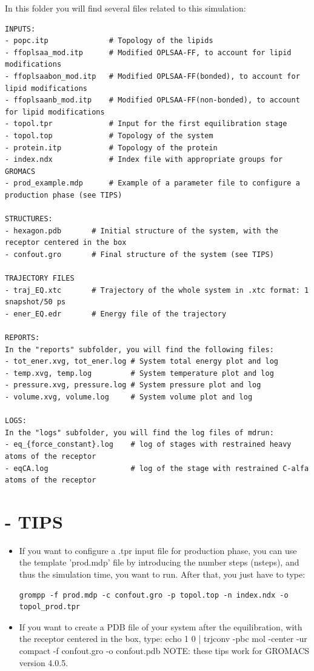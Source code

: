 \documentclass[10pt, oneside, pdftex]{article}
\begin{document}
In this folder you will find several files related to this simulation:

\begin{Verbatim}
INPUTS:
- popc.itp              # Topology of the lipids
- ffoplsaa_mod.itp      # Modified OPLSAA-FF, to account for lipid modifications
- ffoplsaabon_mod.itp   # Modified OPLSAA-FF(bonded), to account for lipid modifications
- ffoplsaanb_mod.itp    # Modified OPLSAA-FF(non-bonded), to account for lipid modifications
- topol.tpr             # Input for the first equilibration stage
- topol.top             # Topology of the system
- protein.itp           # Topology of the protein
- index.ndx             # Index file with appropriate groups for GROMACS
- prod_example.mdp      # Example of a parameter file to configure a production phase (see TIPS)

STRUCTURES:
- hexagon.pdb   	# Initial structure of the system, with the receptor centered in the box
- confout.gro   	# Final structure of the system (see TIPS)

TRAJECTORY FILES
- traj_EQ.xtc   	# Trajectory of the whole system in .xtc format: 1 snapshot/50 ps	 
- ener_EQ.edr   	# Energy file of the trajectory

REPORTS:
In the "reports" subfolder, you will find the following files:
- tot_ener.xvg, tot_ener.log # System total energy plot and log
- temp.xvg, temp.log         # System temperature plot and log
- pressure.xvg, pressure.log # System pressure plot and log
- volume.xvg, volume.log     # System volume plot and log

LOGS:
In the "logs" subfolder, you will find the log files of mdrun:
- eq_{force_constant}.log    # log of stages with restrained heavy atoms of the receptor
- eqCA.log                   # log of the stage with restrained C-alfa atoms of the receptor
\end{Verbatim}

\section*{ - TIPS}
\begin{itemize}
\item{If you want to configure a .tpr input file for production phase, you
can use the  template 'prod.mdp' file by introducing  the number steps
(nsteps), and thus  the simulation time, you want  to run. After that,
you just have to type:
\begin{Verbatim}
grompp -f prod.mdp -c confout.gro -p topol.top -n index.ndx -o topol_prod.tpr
\end{Verbatim}
}

\item{If  you  want  to  create  a  PDB file  of  your  system  after  the
equilibration, with the receptor centered in the box, type: echo 1 0 |
trjconv  -pbc mol -center  -ur compact  -f confout.gro  -o confout.pdb
NOTE: these tips work for GROMACS version 4.0.5.}
\end{itemize}
\end{document}
